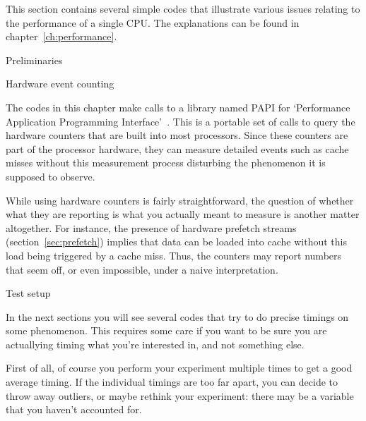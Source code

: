 
This section contains several simple codes that illustrate various
issues relating to the performance of a single CPU. The explanations
can be found in chapter~\ref{ch:performance}.

 {Preliminaries}

 {Hardware event counting}
\label{sec:papi}

The codes in this chapter make calls to a library named PAPI for
`Performance Application Programming
Interface'~\cite{Brown:IJHPCA:papi,papi-homepage}. This is a portable set of calls
to query the hardware counters that are built into most
processors. Since these counters are part of the processor hardware,
they can measure detailed events such as cache misses without this
measurement process disturbing the phenomenon it is supposed to
observe.

While using hardware counters is fairly straightforward, the question
of whether what they are reporting is what you actually meant to
measure is another matter altogether. For instance, the presence of
hardware prefetch streams (section~\ref{sec:prefetch}) implies that
data can be loaded into cache without this load being triggered by a
cache miss. Thus, the counters may report numbers that seem off, or
even impossible, under a naive interpretation.

 {Test setup}

In the next sections you will see several codes that try to do 
precise timings on some phenomenon. This requires some care if you
want to be sure you are actuallying timing what you're interested in, and
not something else. 

First of all, of course you perform your experiment 
multiple times to get a good average timing. If the individual timings
are too far apart, you can decide to throw away outliers, or maybe
rethink your experiment: there may be a variable that you haven't accounted
for.

